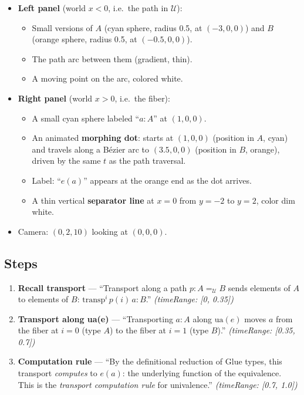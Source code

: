 \documentclass[11pt,a4paper]{article}
\begin{document}
\begin{itemize}
  \item \textbf{Left panel} (world $x < 0$, i.e.\ the path in $\mathcal{U}$):
    \begin{itemize}
      \item Small versions of $A$ (cyan sphere, radius 0.5, at $(-3, 0, 0)$)
        and $B$ (orange sphere, radius 0.5, at $(-0.5, 0, 0)$).
      \item The path arc between them (gradient, thin).
      \item A moving point on the arc, colored white.
    \end{itemize}
  \item \textbf{Right panel} (world $x > 0$, i.e.\ the fiber):
    \begin{itemize}
      \item A small cyan sphere labeled ``$a : A$'' at $(1, 0, 0)$.
      \item An animated \textbf{morphing dot}: starts at $(1, 0, 0)$ (position
        in $A$, cyan) and travels along a Bézier arc to $(3.5, 0, 0)$ (position
        in $B$, orange), driven by the same $t$ as the path traversal.
      \item Label: ``$e(a)$'' appears at the orange end as the dot arrives.
      \item A thin vertical \textbf{separator line} at $x = 0$ from $y=-2$ to
        $y=2$, color dim white.
    \end{itemize}
  \item Camera: $(0, 2, 10)$ looking at $(0, 0, 0)$.
\end{itemize}

\subsection{Steps}

\begin{enumerate}
  \item \textbf{Recall transport} — ``Transport along a path $p : A =_{\mathcal{U}}
    B$ sends elements of $A$ to elements of $B$: $\mathrm{transp}^i\,p(i)\,a : B$.''
    \textit{(timeRange: [0, 0.35])}
  \item \textbf{Transport along ua(e)} — ``Transporting $a : A$ along
    $\mathrm{ua}(e)$ moves $a$ from the fiber at $i=0$ (type $A$) to the fiber
    at $i=1$ (type $B$).''
    \textit{(timeRange: [0.35, 0.7])}
  \item \textbf{Computation rule} — ``By the definitional reduction of Glue
    types, this transport \emph{computes} to $e(a)$: the underlying function of
    the equivalence.  This is the \emph{transport computation rule} for
    univalence.''
    \textit{(timeRange: [0.7, 1.0])}
\end{enumerate}
\end{document}
